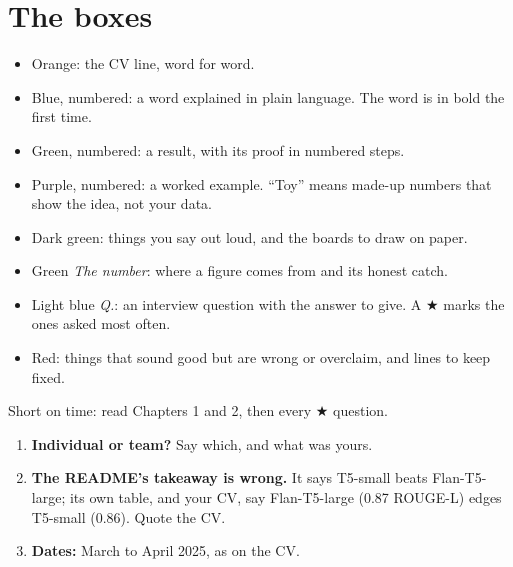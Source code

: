 \section*{The boxes}
\begin{itemize}
  \item Orange: the CV line, word for word.
  \item Blue, numbered: a word explained in plain language. The word is in bold the first time.
  \item Green, numbered: a result, with its proof in numbered steps.
  \item Purple, numbered: a worked example. ``Toy'' means made-up numbers that show the idea, not your data.
  \item Dark green: things you say out loud, and the boards to draw on paper.
  \item Green \emph{The number}: where a figure comes from and its honest catch.
  \item Light blue \emph{Q.}: an interview question with the answer to give. A $\bigstar$ marks the ones asked most often.
  \item Red: things that sound good but are wrong or overclaim, and lines to keep fixed.
\end{itemize}
Short on time: read Chapters 1 and 2, then every $\bigstar$ question.

\begin{bugfix}
\begin{enumerate}
  \item \textbf{Individual or team?} Say which, and what was yours.
  \item \textbf{The README's takeaway is wrong.} It says T5-small beats Flan-T5-large; its own table, and your CV, say Flan-T5-large (0.87 ROUGE-L) edges T5-small (0.86). Quote the CV.
  \item \textbf{Dates:} March to April 2025, as on the CV.
\end{enumerate}
\end{bugfix}
